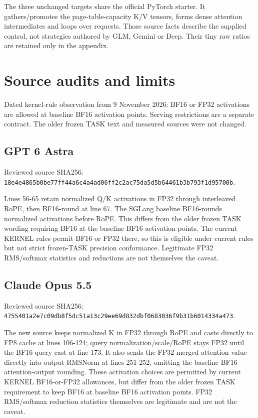 \documentclass[11pt,letterpaper]{article}
\newcommand{\hash}[1]{{\footnotesize\nolinkurl{#1}}}
\begin{document}
The three unchanged targets share the official PyTorch starter. It gathers/promotes the page-table-capacity K/V tensors, forms dense attention intermediates and loops over requests. Those source facts describe the supplied control, not strategies authored by GLM, Gemini or Deep. Their tiny raw ratios are retained only in the appendix.

\section{Source audits and limits}

Dated kernel-rule observation from 9 November 2026: BF16 or FP32 activations are allowed at baseline BF16 activation points. Serving restrictions are a separate contract. The older frozen TASK text and measured sources were not changed.

\subsection*{GPT 6 Astra}

Reviewed source SHA256: \hash{18e4e4865b0be77ff44a6c4a4ad06ff2c2ac75da5d5b64461b3b793f1d95700b}.


Lines 56-65 retain normalized Q/K activations in FP32 through interleaved RoPE, then BF16-round at line 67. The SGLang baseline BF16-rounds normalized activations before RoPE. This differs from the older frozen TASK wording requiring BF16 at the baseline BF16 activation points. The current KERNEL rules permit BF16 or FP32 there, so this is eligible under current rules but not strict frozen-TASK precision conformance. Legitimate FP32 RMS/softmax statistics and reductions are not themselves the caveat.

\subsection*{Claude Opus 5.5}

Reviewed source SHA256: \hash{4755401a2e7c09db8f5dc51a13c29ee69d832dbf0683036f9b31b6014334a473}.


The new source keeps normalized K in FP32 through RoPE and casts directly to FP8 cache at lines 106-124; query normalization/scale/RoPE stays FP32 until the BF16 query cast at line 173. It also sends the FP32 merged attention value directly into output RMSNorm at lines 251-252, omitting the baseline BF16 attention-output rounding. These activation choices are permitted by current KERNEL BF16-or-FP32 allowances, but differ from the older frozen TASK requirement to keep BF16 at baseline BF16 activation points. FP32 RMS/softmax reduction statistics themselves are legitimate and are not the caveat.
\end{document}
